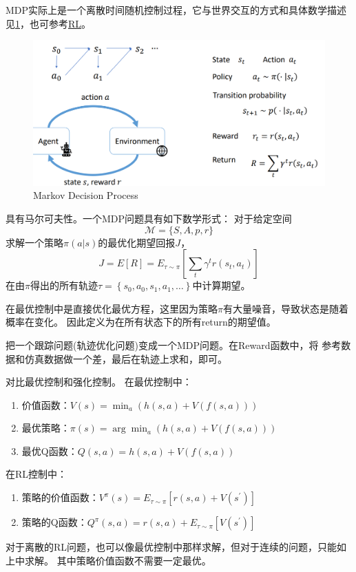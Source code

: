 \documentclass[lang=cn,newtx,10pt,scheme=chinese]{elegantbook}
\begin{document}
MDP实际上是一个离散时间随机控制过程，它与世界交互的方式和具体数学描述
见\ref{fig:MDP}，也可参考\href{https://github.com/foocker/RL}{RL}。
\begin{figure}[htbp]
  \centering
  \includegraphics[totalheight=2in]{"./image/MDP.png"}
  \caption{Markov Decision Process} \label{fig:MDP}
\end{figure}
具有马尔可夫性。一个MDP问题具有如下数学形式：
对于给定空间
\begin{equation}
  \mathcal{M}=\{S, A, p, r\}
\end{equation}
求解一个策略$\pi(a|s)$的最优化期望回报$J$，
\begin{equation}
  J=E[R]=E_{\tau \sim \pi}\left[\sum_t \gamma^t r\left(s_t, a_t\right)\right]
\end{equation}
在由$\pi$得出的所有轨迹$\tau=\left\{s_0, a_0, s_1, a_1, \ldots\right\}$中计算期望。

在最优控制中是直接优化最优方程，这里因为策略$\pi$有大量噪音，导致状态是随着概率在变化。
因此定义为在所有状态下的所有return的期望值。

把一个跟踪问题(轨迹优化问题)变成一个MDP问题。在Reward函数中，将
参考数据和仿真数据做一个差，最后在轨迹上求和，即可。

对比最优控制和强化控制。
在最优控制中：
\begin{enumerate}
  \setlength{\itemindent}{2em}
  \item 价值函数：$V(s)=\min _a(h(s, a)+V(f(s, a)))$
  \item 最优策略：$\pi(s)=\arg \min _a(h(s, a)+V(f(s, a)))$
  \item 最优Q函数：$Q(s, a)=h(s, a)+V(f(s, a))$
\end{enumerate}

在RL控制中：
\begin{enumerate}
  \setlength{\itemindent}{2em}
  \item 策略的价值函数：$V^\pi(s)=E_{\tau \sim \pi}\left[r(s, a)+V\left(s^{\prime}\right)\right]$
  \item 策略的Q函数：$Q^\pi(s, a)=r(s, a)+E_{\tau \sim \pi}\left[V\left(s^{\prime}\right)\right]$
\end{enumerate}
对于离散的RL问题，也可以像最优控制中那样求解，但对于连续的问题，只能如上中求解。
其中策略价值函数不需要一定最优。
\end{document}
